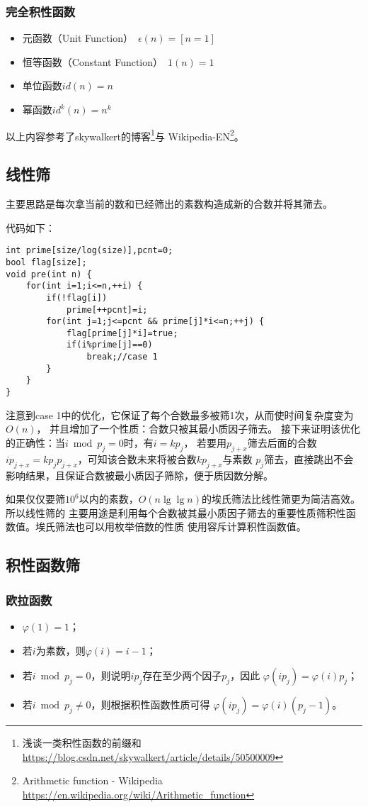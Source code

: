 \subsubsection{完全积性函数}
\begin{itemize}
	\item {}
	      元函数（Unit Function）~$\epsilon(n)=[n=1]$
	\item {}
	      恒等函数（Constant Function）~$1(n)=1$
	\item 单位函数$id(n)=n$
	\item 幂函数$id^k(n)=n^k$
\end{itemize}
以上内容参考了skywalkert的博客\footnote{浅谈一类积性函数的前缀和\\
	\url{https://blog.csdn.net/skywalkert/article/details/50500009}}与
Wikipedia-EN\footnote{Arithmetic function - Wikipedia
	\url{https://en.wikipedia.org/wiki/Arithmetic\_function}}。
\subsection{线性筛}
主要思路是每次拿当前的数和已经筛出的素数构造成新的合数并将其筛去。

代码如下：
\begin{lstlisting}[title=Euler]
int prime[size/log(size)],pcnt=0;
bool flag[size];
void pre(int n) {
    for(int i=1;i<=n,++i) {
        if(!flag[i])
            prime[++pcnt]=i;
        for(int j=1;j<=pcnt && prime[j]*i<=n;++j) {
            flag[prime[j]*i]=true;
            if(i%prime[j]==0)
                break;//case 1
        }
    }
}
\end{lstlisting}
注意到case 1中的优化，它保证了每个合数最多被筛1次，从而使时间复杂度变为$O(n)$，
并且增加了一个性质：合数只被其最小质因子筛去。
接下来证明该优化的正确性：当$i\bmod p_j=0$时，有$i=kp_j$，
若要用$p_{j+x}$筛去后面的合数$ip_{j+x}=kp_jp_{j+x}$，可知该合数未来将被合数$kp_{j+x}$与素数
$p_j$筛去，直接跳出不会影响结果，且保证合数被最小质因子筛除，便于质因数分解。

如果仅仅要筛$10^6$以内的素数，$O(n\lg\lg n)$的埃氏筛法比线性筛更为简洁高效。所以线性筛的
主要用途是利用每个合数被其最小质因子筛去的重要性质筛积性函数值。埃氏筛法也可以用枚举倍数的性质
使用容斥计算积性函数值。
\subsection{积性函数筛}
\subsubsection{欧拉函数}
\begin{itemize}
	\item $\varphi(1)=1$；
	\item 若$i$为素数，则$\varphi(i)=i-1$；
	\item 若$i \bmod p_j=0$，则说明$ip_j$存在至少两个因子$p_j$，因此
	      $\varphi(ip_j)=\varphi(i)p_j$；
	\item 若$i \bmod p_j\neq 0$，则根据积性函数性质可得
	      $\varphi(ip_j)=\varphi(i)(p_j-1)$。
\end{itemize}
